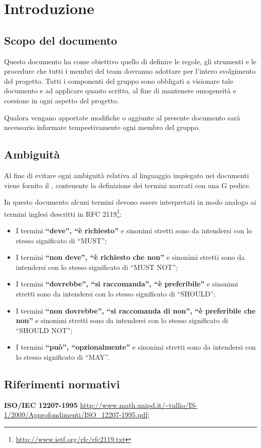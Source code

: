 \section{Introduzione}

\subsection{Scopo del documento}

Questo documento ha come obiettivo quello di definire le regole, gli strumenti e le procedure che tutti i membri del team dovranno adottare per l'intero svolgimento del progetto. Tutti i componenti del gruppo sono obbligati a visionare tale documento e ad applicare quanto scritto, al fine di mantenere omogeneità e coesione in ogni aspetto del progetto.

Qualora vengano apportate modifiche o aggiunte al presente documento sarà necessario informare tempestivamente ogni membro del gruppo.

\subsection{Ambiguità}

Al fine di evitare ogni ambiguità relativa al linguaggio impiegato nei documenti viene fornito il \Glossario{}, contenente la definizione dei termini marcati con una G pedice.

In questo documento alcuni termini devono essere interpretati in modo analogo ai termini inglesi descritti in RFC 2119\footnote{\url{http://www.ietf.org/rfc/rfc2119.txt}}:
\begin{itemize}
 \item I termini \textbf{``deve'', ``è richiesto''} e sinonimi stretti sono da intendersi con lo stesso significato di ``MUST'';
 \item I termini \textbf{``non deve'', ``è richiesto che non''} e sinonimi stretti sono da intendersi con lo stesso significato di ``MUST NOT'';
 \item I termini \textbf{``dovrebbe'', ``si raccomanda'', ``è preferibile''} e sinonimi stretti sono da intendersi con lo stesso significato di ``SHOULD'';
 \item I termini \textbf{``non dovrebbe'', ``si raccomanda di non'', ``è preferibile che non''} e sinonimi stretti sono da intendersi con lo stesso significato di ``SHOULD NOT'';
 \item I termini \textbf{``può'', ``opzionalmente''} e sinonimi stretti sono da intendersi con lo stesso significato di ``MAY''.
\end{itemize}

\subsection{Riferimenti normativi}
\textbf{ISO/IEC 12207-1995} \url{http://www.math.unipd.it/~tullio/IS-1/2009/Approfondimenti/ISO_12207-1995.pdf};